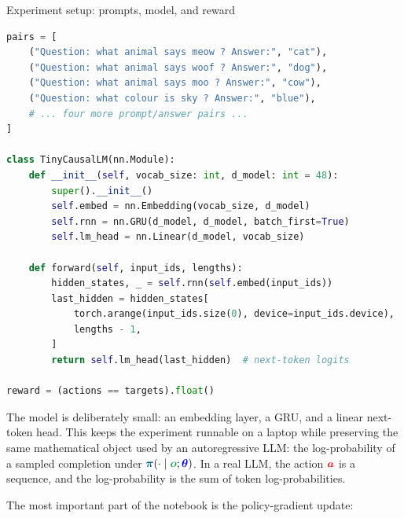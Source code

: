 \documentclass{article}
\newcommand{\colsym}[2]{\ensuremath{\textcolor{#1}{\boldsymbol{#2}}}}
\newcommand{\action}{\colsym{red}{a}}
\newcommand{\obs}{\colsym{ForestGreen}{o}}
\newcommand{\params}{\colsym{blue}{\theta}}
\newcommand{\policy}{\colsym{MidnightBlue}{\pi}}
\begin{document}
\begin{examplebox}{Experiment setup: prompts, model, and reward}
\begin{lstlisting}[language=Python]
pairs = [
    ("Question: what animal says meow ? Answer:", "cat"),
    ("Question: what animal says woof ? Answer:", "dog"),
    ("Question: what animal says moo ? Answer:", "cow"),
    ("Question: what colour is sky ? Answer:", "blue"),
    # ... four more prompt/answer pairs ...
]

class TinyCausalLM(nn.Module):
    def __init__(self, vocab_size: int, d_model: int = 48):
        super().__init__()
        self.embed = nn.Embedding(vocab_size, d_model)
        self.rnn = nn.GRU(d_model, d_model, batch_first=True)
        self.lm_head = nn.Linear(d_model, vocab_size)

    def forward(self, input_ids, lengths):
        hidden_states, _ = self.rnn(self.embed(input_ids))
        last_hidden = hidden_states[
            torch.arange(input_ids.size(0), device=input_ids.device),
            lengths - 1,
        ]
        return self.lm_head(last_hidden)  # next-token logits

reward = (actions == targets).float()
\end{lstlisting}
\end{examplebox}

The model is deliberately small: an embedding layer, a GRU, and a linear next-token head. This keeps the experiment runnable on a laptop while preserving the same mathematical object used by an autoregressive LLM: the log-probability of a sampled completion under \(\policy(\cdot\mid\obs;\params)\). In a real LLM, the action \action{} is a sequence, and the log-probability is the sum of token log-probabilities.

The most important part of the notebook is the policy-gradient update:
\end{document}
